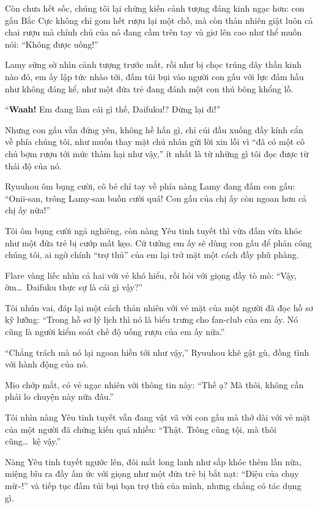 \documentclass[../main.tex]{subfiles}
\begin{document}
Còn chưa hết sốc, chúng tôi lại chứng kiến cảnh tượng đáng kinh ngạc hơn: con gấu Bắc Cực không chỉ gom hết rượu lại một chỗ, mà còn thản nhiên giật luôn cả chai rượu mà chính chủ của nó đang cầm trên tay và giơ lên cao như thể muốn nói: ``Không được uống!''

Lamy sững sờ nhìn cảnh tượng trước mắt, rồi như bị chọc trúng dây thần kinh nào đó, em ấy lập tức nhào tới, đấm túi bụi vào người con gấu với lực đấm hầu như không đáng kể, như một đứa trẻ đang đánh một con thú bông khổng lồ.

``\textbf{Waah!} Em đang làm cái gì thế, Daifuku!? Dừng lại đi!''

Nhưng con gấu vẫn đứng yên, không hề hấn gì, chỉ cúi đầu xuống đầy kính cẩn về phía chúng tôi, như muốn thay mặt chủ nhân gửi lời xin lỗi vì ``đã có một cô chủ bợm rượu tới mức thảm hại như vậy,'' ít nhất là từ những gì tôi đọc được từ thái độ của nó.

Ryuuhou ôm bụng cười, cô bé chỉ tay về phía nàng Lamy đang đấm con gấu: ``Onii-san, trông Lamy-san buồn cười quá! Con gấu của chị ấy còn ngoan hơn cả chị ấy nữa!''

Tôi ôm bụng cười ngả nghiêng, còn nàng Yêu tinh tuyết thì vừa đấm vừa khóc như một đứa trẻ bị cướp mất kẹo. Cứ tưởng em ấy sẽ dùng con gấu để phản công chúng tôi, ai ngờ chính ``trợ thủ'' của em lại trở mặt một cách đầy phũ phàng.

Flare vàng liếc nhìn cả hai với vẻ khó hiểu, rồi hỏi với giọng đầy tò mò: ``Vậy, ờm\dots\ Daifuku thực sự là cái gì vậy?''

Tôi nhún vai, đáp lại một cách thản nhiên với vẻ mặt của một người đã đọc hồ sơ kỹ lưỡng: ``Trong hồ sơ lý lịch thì nó là biểu trưng cho fan-club của em ấy. Nó cũng là người kiểm soát chế độ uống rượu của em ấy nữa.''

``Chẳng trách mà nó lại ngoan hiền tới như vậy,'' Ryuuhou khẽ gật gù, đồng tình với hành động của nó.

Mio chớp mắt, có vẻ ngạc nhiên với thông tin này: ``Thế ạ? Mà thôi, không cần phải lo chuyện này nữa đâu.''

Tôi nhìn nàng Yêu tinh tuyết vẫn đang vật vã với con gấu mà thở dài với vẻ mặt của một người đã chứng kiến quá nhiều: ``Thật. Trông cũng tội, mà thôi cũng\dots\ kệ vậy.''

Nàng Yêu tinh tuyết ngước lên, đôi mắt long lanh như sắp khóc thêm lần nữa, miệng bĩu ra đầy ấm ức với giọng như một đứa trẻ bị bắt nạt: ``Diệu của chụy mừ\~{}!'' và tiếp tục đấm túi bụi bạn trợ thủ của mình, nhưng chẳng có tác dụng gì.
\end{document}
